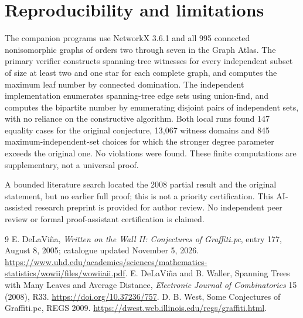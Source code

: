 \documentclass[11pt,a4paper]{article}
\begin{document}
\section{Reproducibility and limitations}
The companion programs use NetworkX 3.6.1 and all 995 connected nonisomorphic graphs of orders two through seven in the Graph Atlas. The primary verifier constructs spanning-tree witnesses for every independent subset of size at least two and one star for each complete graph, and computes the maximum leaf number by connected domination. The independent implementation enumerates spanning-tree edge sets using union-find, and computes the bipartite number by enumerating disjoint pairs of independent sets, with no reliance on the constructive algorithm. Both local runs found 147 equality cases for the original conjecture, 13,067 witness domains and 845 maximum-independent-set choices for which the stronger degree parameter exceeds the original one. No violations were found. These finite computations are supplementary, not a universal proof.

A bounded literature search located the 2008 partial result and the original statement, but no earlier full proof; this is not a priority certification. This AI-assisted research preprint is provided for author review. No independent peer review or formal proof-assistant certification is claimed.
\begin{thebibliography}{9}
 E. DeLaVi\~na, \emph{Written on the Wall II: Conjectures of Graffiti.pc}, entry 177, August 8, 2005; catalogue updated November 5, 2026. \url{https://www.uhd.edu/academics/sciences/mathematics-statistics/wowii/files/wowiiaii.pdf}.
 E. DeLaVi\~na and B. Waller, Spanning Trees with Many Leaves and Average Distance, \emph{Electronic Journal of Combinatorics} 15 (2008), R33. \url{https://doi.org/10.37236/757}.
 D. B. West, Some Conjectures of Graffiti.pc, REGS 2009. \url{https://dwest.web.illinois.edu/regs/graffiti.html}.
\end{thebibliography}
\end{document}

